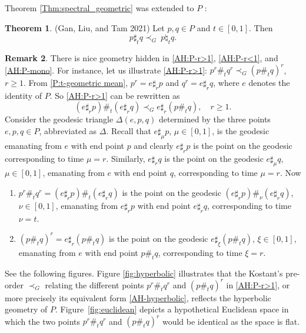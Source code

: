 \documentclass[12pt, reqno]{amsart}
\numberwithin{equation}{section}
\theoremstyle{definition}
\newtheorem{theorem}{Theorem}[section]
\newtheorem{remark}[theorem]{Remark}
\renewcommand{\ge}{\geqslant}
\begin{document}
Theorem \ref{Thm:spectral_geometric} was extended to $P$ \cite {GLT21}: 
\begin{theorem} \rm (Gan, Liu, and Tam 2021)
Let $p,q \in P$ and $t \in [0, 1]$. Then
\begin{equation}
p \sharp_t q\prec_G \ p \natural_t q.
\end{equation}
\end{theorem}


 

\begin{remark}\label{geometry} 
There is nice geometry hidden in \eqref{AH:P-r>1}, \eqref{AH:P-r<1}, and \eqref{AH:P-mono}. For instance, let us illustrate \eqref{AH:P-r>1}: $p^r\#_tq^r \prec_G (p\#_tq)^r$,  $r\ge 1$. From \eqref{P:t-geometric mean}, $p^r = e\sharp_r p$ and $q^r = e\sharp_r q$, where $e$ denotes the identity of $P$. So \eqref{AH:P-r>1} can be rewritten as
\begin{equation}\label{AH-hyperbolic}
(e\sharp_r p) \#_t (e\sharp_r q) \prec_G e \sharp_r (p\#_tq), \quad r\ge 1.
\end{equation}
Consider the geodesic triangle $\Delta(e, p, q)$ determined by the three points $e, p, q\in P$, abbreviated as $\Delta$.
Recall that $e\sharp_\mu p$, $\mu\in[0,1]$, is the geodesic emanating from $e$ with end point $p$ and clearly $e\sharp_r p$ is the point on the geodesic corresponding to time $\mu=r$. Similarly, $e\sharp_r q$ is the point on the geodesic $e\sharp_\mu q$, $\mu\in[0,1]$, emanating from $e$ with end point $q$, corresponding to time $\mu=r$. Now 
\begin{enumerate}
\item $p^r\#_tq^r=(e\sharp_r p) \#_t (e\sharp_r q)$ is the point on the geodesic $(e\sharp_r p) \#_\nu (e\sharp_r q)$, $\nu\in[0,1]$, emanating from $e\sharp_r p$  with end point $e\sharp_r q$, corresponding to time $\nu=t$. 
\item
$(p\#_tq)^r = e \sharp_r (p\#_tq)$ is the point on the geodesic $e \sharp_\xi (p\#_tq)$, $\xi\in[0,1]$, emanating from $e$  with end point $p\#_tq$, corresponding to time $\xi=r$.
\end{enumerate}
See the following figures. Figure \ref{fig:hyperbolic} illustrates that the Kostant's pre-order $\prec_G$ relating the different points $p^r\#_t q^r$ and  $(p\#_tq)^r$ in \eqref{AH:P-r>1}, or more precisely its equivalent form \eqref{AH-hyperbolic}, reflects the hyperbolic geometry of $P$. Figure~\ref{fig:euclidean} depicts a hypothetical Euclidean space in which
the two points $p^r\#_tq^r$ and $(p\#_tq)^r$ would be identical as the space is flat.



\end{remark}
\end{document}
